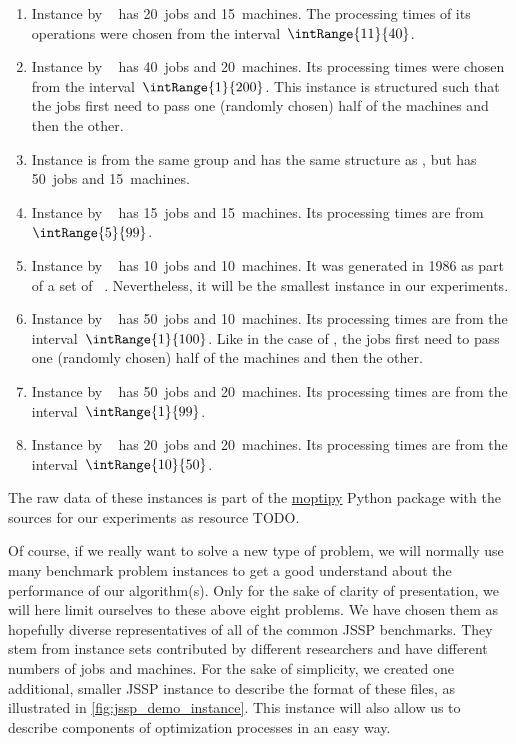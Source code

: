 \begin{enumerate}%
%
\item Instance  by \citeauthor{ABZ1988TSBPFJSS}~\cite{ABZ1988TSBPFJSS} has 20~jobs and 15~machines.
The processing times of its operations were chosen from the interval~$\intRange{11}{40}$.%
%
\item Instance  by \citeauthor{DMU1998BFSSP}~\cite{DMU1998BFSSP} has 40~jobs and 20~machines.
Its processing times were chosen from the interval~$\intRange{1}{200}$.
This instance is structured such that the jobs first need to pass one (randomly chosen) half of the machines and then the other.%
%
\item Instance  is from the same group and has the same structure as , but has 50~jobs and 15~machines.%
%
\item Instance  by \citeauthor{L1998RCPSAEIOHSTS}~\cite{L1998RCPSAEIOHSTS} has 15~jobs and 15~machines.
Its processing times are from~$\intRange{5}{99}$.%
%
\item Instance  by \citeauthor{AC1991ACSOTJSSP}~\cite{AC1991ACSOTJSSP} has 10~jobs and 10~machines.
It was generated in 1986 as part of a set of ~\cite{JM1999DJSSPPAF,H2002PJSSP}.
Nevertheless, it will be the smallest instance in our experiments.%
%
\item Instance  by \citeauthor{SWV1992NSSFSPWATJSS}~\cite{SWV1992NSSFSPWATJSS} has 50~jobs and 10~machines.
Its processing times are from the interval~$\intRange{1}{100}$.
Like in the case of , the jobs first need to pass one (randomly chosen) half of the machines and then the other.%
%
\item Instance  by \citeauthor{T1993BFBSP}~\cite{T1993BFBSP} has 50~jobs and 20~machines.
Its processing times are from the interval~$\intRange{1}{99}$.%
%
\item Instance  by \citeauthor{YN1992AGAATLSJSI}~\cite{YN1992AGAATLSJSI} has 20~jobs and 20~machines.
Its processing times are from the interval~$\intRange{10}{50}$.%
%
\end{enumerate}%
%
The raw data of these instances is part of the \href{\moptipyUrl}{moptipy} Python package with the sources for our experiments as resource TODO.

Of course, if we really want to solve a new type of problem, we will normally use many benchmark problem instances to get a good understand about the performance of our algorithm(s).
Only for the sake of clarity of presentation, we will here limit ourselves to these above eight problems.
We have chosen them as hopefully diverse representatives of all of the common JSSP benchmarks.
They stem from instance sets contributed by different researchers and have different numbers of jobs and machines.%
%
\endhsection%
%
%
\label{sec:jsspDemoInstance}%
For the sake of simplicity, we created one additional, smaller JSSP instance to describe the format of these files, as illustrated in \autoref{fig:jssp_demo_instance}.
This instance will also allow us to describe components of optimization processes in an easy way.

